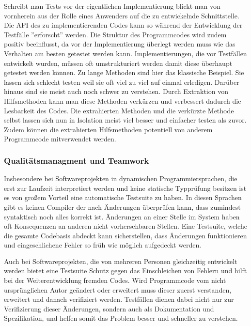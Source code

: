 Schreibt man Tests vor der eigentlichen Implementierung blickt man von
vornherein aus der Rolle eines Anwenders auf die zu entwickelnde
Schnittstelle. Die API des zu implementierenden Codes kann so während
der Entwicklung der Testfälle ''erforscht'' werden. Die Struktur des
Programmcodes wird zudem positiv beeinflusst, da vor der
Implementierung überlegt werden muss wie das Verhalten am besten
getestet werden kann. Implementierungen, die vor Testfällen entwickelt
wurden, müssen oft umstrukturiert werden damit diese überhaupt
getestet werden können. Zu lange Methoden sind hier das klassische
Beispiel. Sie lassen sich schlecht testen weil sie oft viel zu viel
auf einmal erledigen. Darüber hinaus sind sie meist auch noch schwer
zu verstehen. Durch Extraktion von Hilfsmethoden kann man diese
Methoden verkürzen und verbessert dadurch die Lesbarkeit des
Codes. Die extrahierten Methoden und die verkürzte Methode selbst
lassen sich nun in Isolation meist viel besser und einfacher testen
als zuvor. Zudem können die extrahierten Hilfsmethoden potentiell von
anderem Programmcode mitverwendet werden.

\subsubsection{Qualitätsmanagment und Teamwork}

Insbesondere bei Softwareprojekten in dynamischen Programmiersprachen,
die erst zur Laufzeit interpretiert werden und keine statische
Typprüfung besitzen ist es von großem Vorteil eine automatische
Testsuite zu haben. In diesen Sprachen gibt es keinen Compiler der
nach Änderungen überprüfen kann, dass zumindest syntaktisch noch alles
korrekt ist. Änderungen an einer Stelle im System haben oft
Konsequenzen an anderen nicht vorhersehbaren Stellen. Eine Testsuite,
welche die gesamte Codebasis abdeckt kann sicherstellen, dass
Änderungen funktionieren und eingeschlichene Fehler so früh wie
möglich aufgedeckt werden.

Auch bei Softwareprojekten, die von mehreren Personen gleichzeitig
entwickelt werden bietet eine Testsuite Schutz gegen das Einschleichen
von Fehlern und hilft bei der Weiterentwicklung fremden Codes. Wird
Programmcode vom nicht ursprünglichen Autor geändert oder erweitert
muss dieser zuerst verstanden, erweitert und danach verifiziert
werden. Testfällen dienen dabei nicht nur zur Verifizierung dieser
Änderungen, sondern auch als Dokumentation und Spezifikation, und
helfen somit das Problem besser und schneller zu verstehen.

